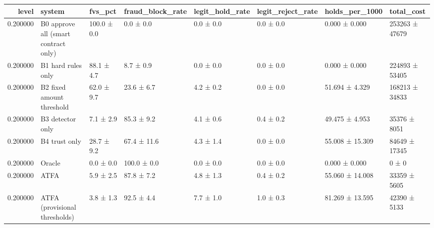 \begin{tabular}{rlllllll}
\toprule
level & system & fvs\_pct & fraud\_block\_rate & legit\_hold\_rate & legit\_reject\_rate & holds\_per\_1000 & total\_cost \\
\midrule
0.200000 & B0 approve all (smart contract only) & 100.0 ± 0.0 & 0.0 ± 0.0 & 0.0 ± 0.0 & 0.0 ± 0.0 & 0.000 ± 0.000 & 253263 ± 47679 \\
0.200000 & B1 hard rules only & 88.1 ± 4.7 & 8.7 ± 0.9 & 0.0 ± 0.0 & 0.0 ± 0.0 & 0.000 ± 0.000 & 224893 ± 53405 \\
0.200000 & B2 fixed amount threshold & 62.0 ± 9.7 & 23.6 ± 6.7 & 4.2 ± 0.2 & 0.0 ± 0.0 & 51.694 ± 4.329 & 168213 ± 34833 \\
0.200000 & B3 detector only & 7.1 ± 2.9 & 85.3 ± 9.2 & 4.1 ± 0.6 & 0.4 ± 0.2 & 49.475 ± 4.953 & 35376 ± 8051 \\
0.200000 & B4 trust only & 28.7 ± 9.2 & 67.4 ± 11.6 & 4.3 ± 1.4 & 0.0 ± 0.0 & 55.008 ± 15.309 & 84649 ± 17345 \\
0.200000 & Oracle & 0.0 ± 0.0 & 100.0 ± 0.0 & 0.0 ± 0.0 & 0.0 ± 0.0 & 0.000 ± 0.000 & 0 ± 0 \\
0.200000 & ATFA & 5.9 ± 2.5 & 87.8 ± 7.2 & 4.8 ± 1.3 & 0.4 ± 0.2 & 55.060 ± 14.008 & 33359 ± 5605 \\
0.200000 & ATFA (provisional thresholds) & 3.8 ± 1.3 & 92.5 ± 4.4 & 7.7 ± 1.0 & 1.0 ± 0.3 & 81.269 ± 13.595 & 42390 ± 5133 \\
\bottomrule
\end{tabular}
